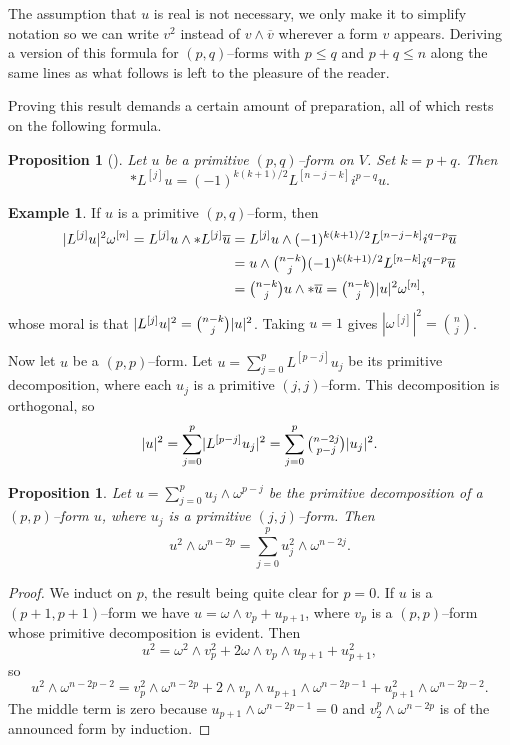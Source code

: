 \documentclass[11pt,a4paper]{amsart}
\def\wp#1{\omega^{[#1]}}
\def\lp#1{L^{[#1]}}
\newtheorem{prop}[theo]{Proposition}
\theoremstyle{definition}
\newtheorem{exam}[theo]{Example}
\numberwithin{equation}{section}
\begin{document}
The assumption that $u$ is real is not necessary, we only make it to
simplify notation so we can write $v^2$ instead of $v \wedge \overline v$
wherever a form $v$ appears. Deriving a version of this formula for
$(p,q)$--forms with $p \leq q$ and $p+q \leq n$ along the same lines as
what follows is left to the pleasure of the reader.

Proving this result demands a certain amount of preparation, all of which
rests on the following formula.


\begin{prop}[{{\cite[Proposition~1.67]{Huy}}}]
Let $u$ be a primitive $(p,q)$--form on $V$. Set $k = p+q$. Then
$$
    * \lp{j} u = (-1)^{k(k+1)/2} \lp{n-j-k} i^{p-q} u.
$$
\end{prop}


\begin{exam}
If $u$ is a primitive $(p,q)$--form, then
\begin{align*}
\lvert \lp{j} u \rvert^2 \wp{n}
= \lp{j} u \wedge * \lp{j} \overline{u}
&= \lp{j} u \wedge (-1)^{k(k+1)/2} \lp{n-j-k} i^{q-p} \overline{u} \\
&= u \wedge \tbinom{n-k}{j} (-1)^{k(k+1)/2} \lp{n-k} i^{q-p} \overline{u} \\
&= \tbinom{n-k}{j} u \wedge * \overline{u}
= \tbinom{n-k}{j} \lvert u \rvert^2 \wp{n},
\end{align*}
whose moral is that $\lvert \lp{j} u \rvert^2 = \tbinom{n-k}{j} \lvert u
\rvert^2$. Taking $u = 1$ gives $|\wp{j}|^2 = \binom{n}{j}$.
\end{exam}


Now let $u$ be a $(p,p)$--form. Let $u = \sum_{j=0}^p \lp{p-j} u_j$ be its primitive decomposition, where each $u_j$ is a primitive $(j,j)$--form. This decomposition is orthogonal, so
$$
\lvert u \rvert^2
= \sum_{j=0}^p \lvert \lp{p-j} u_j \rvert^2
= \sum_{j=0}^p \tbinom{n-2j}{p-j} \lvert u_j \rvert^2.
$$


\begin{prop}
  \label{16}
  Let $u = \sum_{j=0}^p u_j \wedge \omega^{p-j}$ be the primitive
decomposition of a $(p,p)$--form $u$, where $u_j$ is a primitive
$(j,j)$--form. Then
$$
u^2 \wedge \omega^{n-2p}
= \sum_{j=0}^p u_j^2 \wedge \omega^{n-2j}.
$$
\end{prop}

\begin{proof}
  We induct on $p$, the result being quite clear for $p = 0$. If $u$ is
  a $(p+1,p+1)$--form  we have $u = \omega \wedge v_p + u_{p+1}$, where
  $v_p$ is a $(p,p)$--form whose primitive decomposition is evident. Then
$$
u^2 = \omega^2 \wedge v_p^2 + 2 \omega \wedge v_p \wedge u_{p+1} +
u_{p+1}^2,
$$
so
$$
u^2 \wedge \omega^{n-2p-2}
= v_p^2 \wedge \omega^{n-2p}
+ 2 \wedge v_p \wedge u_{p+1} \wedge \omega^{n-2p-1}
+ u_{p+1}^2 \wedge \omega^{n-2p-2}.
$$
The middle term is zero because $u_{p+1} \wedge \omega^{n-2p-1} = 0$
and $v_2^p \wedge \omega^{n-2p}$ is of the announced form by induction.
\end{proof}
\end{document}
